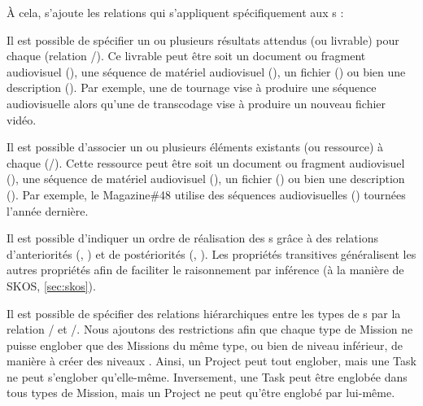 À cela, s'ajoute les relations qui s'appliquent spécifiquement aux s : 
\begin{liste}
	\item Il est possible de spécifier un ou plusieurs résultats attendus (ou livrable) pour chaque  (relation /).
	Ce livrable peut être soit un document ou fragment audiovisuel (), une séquence de matériel audiovisuel (), un fichier () ou bien une description ().
	Par exemple, une  de tournage vise à produire une séquence audiovisuelle alors qu'une  de transcodage vise à produire un nouveau fichier vidéo.

	\item Il est possible d'associer un ou plusieurs éléments existants (ou ressource) à chaque  (/). 
	Cette ressource peut être soit un document ou fragment audiovisuel (), une séquence de matériel audiovisuel (), un fichier () ou bien une description ().
	Par exemple, le  Magazine\#48 utilise des séquences audiovisuelles () tournées l'année dernière.

	\item Il est possible d'indiquer un ordre de réalisation des s grâce à des relations d'anteriorités (, ) et de postériorités (, ).
	Les propriétés transitives généralisent les autres propriétés afin de faciliter le raisonnement par inférence (à la manière de SKOS, \ref{sec:skos}).

	\item Il est possible de spécifier des relations hiérarchiques entre les types de s par la relation / et /.
	Nous ajoutons des restrictions afin que chaque type de Mission ne puisse englober que des Missions du même type, ou bien de niveau inférieur, de manière à créer des niveaux . 
	Ainsi, un Project peut tout englober, mais une Task ne peut s'englober qu'elle-même. 
	Inversement, une Task peut être englobée dans tous types de Mission, mais un Project ne peut qu'être englobé par lui-même.
\end{liste}





